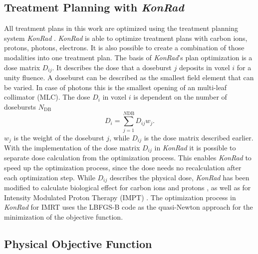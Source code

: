 \subsection{Treatment Planning with \textit{KonRad}}
All treatment plans in this work are optimized using the treatment planning system \textit{KonRad} \cite{nill}. \textit{KonRad} is able to optimize treatment plans with carbon ions, protons, photons, electrons. It is also possible to create a combination of those modalities into one treatment plan. The basis of \textit{KonRad}'s plan optimization is a dose matrix $D_{ij}$. It describes the dose that a doseburst $j$ deposits in voxel $i$ for a unity fluence. A doseburst can be described as the smallest field element that can be varied. In case of photons this is the smallest opening of an multi-leaf collimator (MLC). The dose $D_i$ in voxel $i$ is dependent on the number of dosebursts $N_{\mathrm{DB}}$
\begin{equation}
D_i = \sum\limits_{j=1}^{N\mathrm{DB}}D_{ij}w_j.
\end{equation}
$w_j$ is the weight of the doseburst $j$, while $D_{ij}$ is the dose matrix described earlier. With the implementation of the dose matrix $D_{ij}$ in \textit{KonRad} it is possible to separate dose calculation from the optimization process. This enables \textit{KonRad} to speed up the optimization process, since the dose needs no recalculation after each optimization step. While $D_{ij}$ describes the physical dose, \textit{KonRad} has been modified to calculate biological effect for carbon ions \cite{pmid16757867} and protons \cite{pmid15285249}, as well as for Intensity Modulated Proton Therapy (IMPT) \cite{pmid15789592}. The optimization process in \textit{KonRad} for IMRT uses the LBFGS-B code \cite{Byrd_Lu_Nocedal_Zhu_1994} as the quasi-Newton approach for the minimization of the objective function.
\subsection{Physical Objective Function}\label{chap:objectivefunctions}

